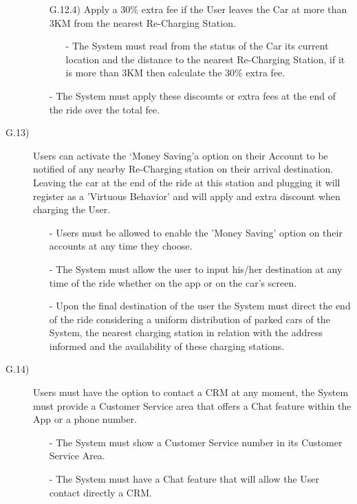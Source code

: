 \documentclass[a4paper]{article}
\begin{document}
\begin{description}
\begin{itemize}
	\item [G.12.4)]Apply a 30\% extra fee if the User leaves the Car at more than 3KM from the nearest Re-Charging Station.
	\begin{itemize}
	\item[-]The System must read from the status of the Car its current location and the distance to the nearest Re-Charging Station, if it is more than 3KM then calculate the 30\% extra fee.
	\end{itemize}
	\item[-]The System must apply these discounts or extra fees at the end of the ride over the total fee.
\end{itemize}

\item [G.13)]Users can activate the `Money Saving'a option on their Account to be notified of any nearby Re-Charging station on their arrival destination. Leaving the car at the end of the ride at this station and plugging it will register as a 'Virtuous Behavior' and will apply and extra discount when charging the User.
\begin{itemize}
	\item[-]Users must be allowed to enable the 'Money Saving' option on their accounts at any time they choose.
	\item[-]The System must allow the user to input his/her destination at any time of the ride whether on the app or on the car's screen.
	\item[-]Upon the final destination of the user the System must direct the end of the ride considering a uniform distribution of parked cars of the System, the nearest charging station in relation with the address informed and  the availability of these charging stations.
\end{itemize}
\item [G.14)]Users must have the option to contact a CRM at any moment, the System must provide a Customer Service area that offers a Chat feature within the App or a phone number.
\begin{itemize}
	\item[-]The System must show a Customer Service number in its Customer Service Area.
	\item[-]The System must have a Chat feature that will allow the User contact directly a CRM.
\end{itemize}
\end{description}
\end{document}

